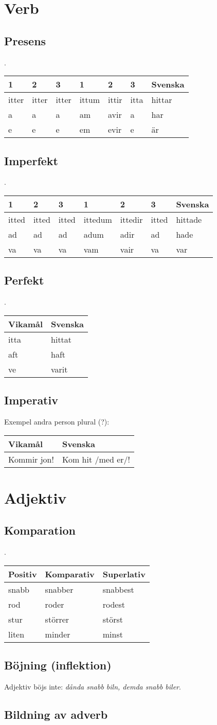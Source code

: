 \documentclass[a4paper]{memoir}
\newcommand{\eline}{\\[\baselineskip]} %
\newenvironment{mytable}[2]
{
  \eline
  \begin{tabular}{#1}
  \hline #2\\ \hline
}
{ \end{tabular} }
\newcommand{\myheader}[1]{ \hline #1\\ \hline }
\newenvironment{wlistvisv} %
{ \begin{mytable}{ l l }{Vikamål & Svenska} }
{ \end{mytable} }
\newenvironment{wlistvcon} %
{ \begin{mytable}{ l l l l l l l }
  {
    1 & 2 & 3 & 1 & 2 & 3 & Svenska
  }
}
{ \end{mytable} }
\newenvironment{wlistinfl} %
{ \begin{mytable}{ l l l }{Positiv & Komparativ & Superlativ} }
{ \end{mytable} }
\begin{document}
    \chapter{Verb}
      \section{Presens}
        .
        \begin{wlistvcon}
          itter & itter & itter & ittum & ittir & itta & hittar\\
          a & a & a & am & avir & a & har\\
          e & e & e & em & evir & e & är\\
        \end{wlistvcon}
      \section{Imperfekt}
        .
        \begin{wlistvcon}
          itted & itted & itted & ittedum & ittedir & itted & hittade\\
          ad & ad & ad & adum & adir & ad & hade\\
          va & va & va & vam & vair & va & var\\
        \end{wlistvcon}
      \section{Perfekt}
        .
        \begin{wlistvisv}
          itta & hittat\\
          aft & haft\\
          ve & varit\\
        \end{wlistvisv}
      \section{Imperativ}
        Exempel andra person plural (?):
        \begin{wlistvisv}
          Kommir jon! & Kom hit /med er/!\\
        \end{wlistvisv}
    \chapter{Adjektiv}
      \section{Komparation}
        .
        \begin{wlistinfl}
          snabb & snabber & snabbest\\
          rod & roder & rodest\\
          stur & störrer & störst\\
          liten & minder & minst\\
        \end{wlistinfl}
      \section{Böjning (inflektion)}
        Adjektiv böjs inte: \emph{dånda snabb biln, demda snabb biler}.
      \section{Bildning av adverb}
\end{document}
